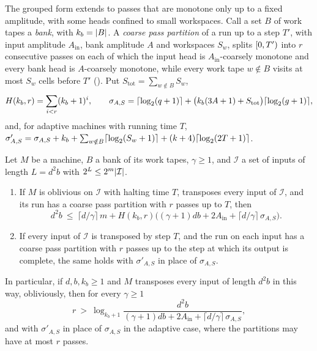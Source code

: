 The grouped form extends to passes that are monotone only up to a fixed amplitude, with some heads confined to small workspaces.
Call a set $B$ of work tapes a \emph{bank}, with $k_b=\lvert B \rvert$. A \emph{coarse pass partition} of a run up to a step $T'$, with input
amplitude $A_{\mathrm{in}}$, bank amplitude $A$ and workspaces $S_w$, splits $[0,T')$ into $r$ consecutive passes on each of which the
input head is $A_{\mathrm{in}}$-coarsely monotone and every bank head is $A$-coarsely monotone, while every work tape $w\notin B$ visits at
most $S_w$ cells before $T'$ (). Put $S_{\mathrm{tot}}=\sum_{w\notin B}S_w$,
\[
  H(k_b,r)=\sum_{i<r}(k_b+1)^i,\qquad \sigma_{A,S}=\lceil \log_2 (q+1) \rceil+\bigl(k_b(3A+1)+S_{\mathrm{tot}}\bigr)\lceil \log_2 (g+1) \rceil,
\]
and, for adaptive machines with running time $T$,
$\sigma'_{A,S}=\sigma_{A,S}+k_b+\sum_{w\notin B}\lceil \log_2 (S_w+1) \rceil+(k+4)\lceil \log_2 (2T+1) \rceil$.

\begin{theorem}\label{thm:coarsepass}
Let $M$ be a machine, $B$ a bank of its work tapes, $\gamma\ge1$, and $\mathcal I$ a set of inputs of length $L=d^2b$ with
$2^{L}\le2^m\lvert \mathcal I \rvert$.
\begin{enumerate}[label=(\alph*)]
\item If $M$ is oblivious on $\mathcal I$ with halting time $T$, transposes every input of $\mathcal I$, and its run has a coarse pass partition
with $r$ passes up to $T$, then
\[
  d^2b\ \le\ \lceil d/\gamma\rceil\,m+H(k_b,r)\bigl((\gamma+1)db+2A_{\mathrm{in}}+\lceil d/\gamma\rceil\,\sigma_{A,S}\bigr).
\]
\item If every input of $\mathcal I$ is transposed by step $T$, and the run on each input has a coarse pass partition with $r$ passes up to
the step at which its output is complete, the same holds with $\sigma'_{A,S}$ in place of $\sigma_{A,S}$.
\end{enumerate}
In particular, if $d,b,k_b\ge1$ and $M$ transposes every input of length $d^2b$ in this way, obliviously, then for every $\gamma\ge1$
\[
  r\ >\ \log_{k_b+1}\frac{d^2b}{(\gamma+1)db+2A_{\mathrm{in}}+\lceil d/\gamma\rceil\,\sigma_{A,S}},
\]
and with $\sigma'_{A,S}$ in place of $\sigma_{A,S}$ in the adaptive case, where the partitions may have at most $r$ passes.
\end{theorem}

